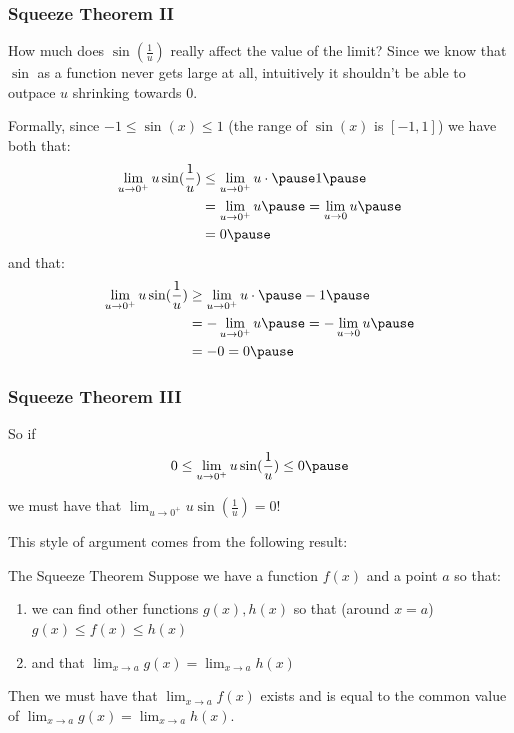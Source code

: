 \documentclass{ltx-talk}
\begin{document}
\begin{frame}
  \frametitle{Squeeze Theorem II}

  How much does $\sin(\frac{1}{u})$ really affect the value of the limit? \pause
  Since we know that $\sin$ as a function never gets large at all, \pause
  intuitively it shouldn't be able to outpace $u$ shrinking towards $0$. \pause

  Formally, since $-1 \leq \sin(x) \leq 1$ (the range of $\sin(x)$ is $[-1,1]$) \pause
  we have both that: \pause
  \begin{align}
    \lim_{u \rightarrow 0^{+}} u \sin(\frac{1}{u}) &\leq \lim_{u \rightarrow 0^{+}} u \cdot \pause 1 \pause \\
                                                   &= \lim_{u \rightarrow 0^{+}} u \pause = \lim_{u \rightarrow 0} u \pause \\
                                                   &= 0 \pause
  \end{align}
  and that: \pause
  \begin{align}
    \lim_{u \rightarrow 0^{+}} u \sin(\frac{1}{u}) & \geq \lim_{u \rightarrow 0^{+}} u \cdot \pause -1 \pause \\
                                                   &= - \lim_{u \rightarrow 0^{+}} u \pause = - \lim_{u \rightarrow 0} u \pause \\
                                                   &= - 0 = 0 \pause
  \end{align}
\end{frame}

\begin{frame}
  \frametitle{Squeeze Theorem III}
  So if \pause
  \begin{equation}
  0 \leq \lim_{u \rightarrow 0^{+}} u \sin(\frac{1}{u}) \leq 0 \pause
  \end{equation}

  we must have that $\lim_{u \rightarrow 0^{+}} u \sin(\frac{1}{u}) = 0$! \pause
  
  This style of argument comes from the following result: \pause
  \begin{alertblock}{The Squeeze Theorem}
    Suppose we have a function $f(x)$ and a point $a$ so that: \pause
    \begin{enumerate}
      \item we can find other functions $g(x), h(x)$ so that \pause (around $x = a$) $g(x) \leq f(x) \leq h(x)$ \pause
      \item and that $\lim_{x \rightarrow a} g(x) = \lim_{x \rightarrow a} h(x)$ \pause
    \end{enumerate}

    Then we must have that $\lim_{x \rightarrow a} f(x)$ exists \pause and is equal to the
    common value of $\lim_{x \rightarrow a} g(x) = \lim_{x \rightarrow a} h(x)$.
  \end{alertblock}
\end{frame}
\end{document}
